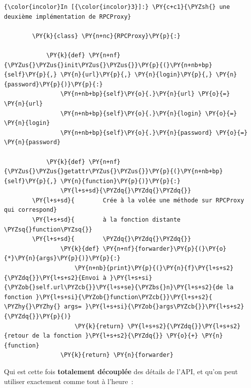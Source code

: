     \begin{Verbatim}[commandchars=\\\{\}]
{\color{incolor}In [{\color{incolor}3}]:} \PY{c+c1}{\PYZsh{} une deuxième implémentation de RPCProxy}
        
        \PY{k}{class} \PY{n+nc}{RPCProxy}\PY{p}{:}
            
            \PY{k}{def} \PY{n+nf}{\PYZus{}\PYZus{}init\PYZus{}\PYZus{}}\PY{p}{(}\PY{n+nb+bp}{self}\PY{p}{,} \PY{n}{url}\PY{p}{,} \PY{n}{login}\PY{p}{,} \PY{n}{password}\PY{p}{)}\PY{p}{:}
                \PY{n+nb+bp}{self}\PY{o}{.}\PY{n}{url} \PY{o}{=} \PY{n}{url}
                \PY{n+nb+bp}{self}\PY{o}{.}\PY{n}{login} \PY{o}{=} \PY{n}{login}
                \PY{n+nb+bp}{self}\PY{o}{.}\PY{n}{password} \PY{o}{=} \PY{n}{password}
                
            \PY{k}{def} \PY{n+nf}{\PYZus{}\PYZus{}getattr\PYZus{}\PYZus{}}\PY{p}{(}\PY{n+nb+bp}{self}\PY{p}{,} \PY{n}{function}\PY{p}{)}\PY{p}{:}
                \PY{l+s+sd}{\PYZdq{}\PYZdq{}\PYZdq{}}
        \PY{l+s+sd}{        Crée à la volée une méthode sur RPCProxy qui correspond}
        \PY{l+s+sd}{        à la fonction distante \PYZsq{}function\PYZsq{}}
        \PY{l+s+sd}{        \PYZdq{}\PYZdq{}\PYZdq{}}
                \PY{k}{def} \PY{n+nf}{forwarder}\PY{p}{(}\PY{o}{*}\PY{n}{args}\PY{p}{)}\PY{p}{:}
                    \PY{n+nb}{print}\PY{p}{(}\PY{n}{f}\PY{l+s+s2}{\PYZdq{}}\PY{l+s+s2}{Envoi à }\PY{l+s+si}{\PYZob{}self.url\PYZcb{}}\PY{l+s+se}{\PYZbs{}n}\PY{l+s+s2}{de la fonction }\PY{l+s+si}{\PYZob{}function\PYZcb{}}\PY{l+s+s2}{ \PYZhy{}\PYZhy{} args= }\PY{l+s+si}{\PYZob{}args\PYZcb{}}\PY{l+s+s2}{\PYZdq{}}\PY{p}{)}
                    \PY{k}{return} \PY{l+s+s2}{\PYZdq{}}\PY{l+s+s2}{retour de la fonction }\PY{l+s+s2}{\PYZdq{}} \PY{o}{+} \PY{n}{function}
                \PY{k}{return} \PY{n}{forwarder}
\end{Verbatim}


    Qui est cette fois \textbf{totalement découplée} des détails de l'API,
et qu'on peut utiliser exactement comme tout à l'heure~:

